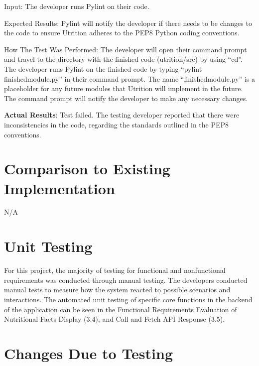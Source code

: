 \documentclass[12pt, titlepage]{article}
\begin{document}
\begin{enumerate}
		Input: The developer runs Pylint on their code.
		
		Expected Results: Pylint will notify the developer if there needs to be changes to the code to ensure Utrition adheres to the PEP8 Python coding conventions.
		
		How The Test Was Performed: The developer will open their command prompt and travel to the directory with the finished code (utrition/src) by using “cd”. The developer runs Pylint on the finished code by typing “pylint finishedmodule.py” in their command prompt. The name “finishedmodule.py” is a placeholder for any future modules that Utrition will implement in the future. The command prompt will notify the developer to make any necessary changes.
		
		\textbf{Actual Results}: Test failed. The testing developer reported that there were inconsistencies in the code, regarding the standards outlined in the PEP8 conventions.
		
		
	\end{enumerate}
	
	\section{Comparison to Existing Implementation}	
	
	N/A
	
	\section{Unit Testing}
	
	For this project, the majority of testing for functional and nonfunctional requirements was conducted through manual testing. The developers conducted manual tests to measure how the system reacted to possible scenarios and interactions. The automated unit testing of specific core functions in the backend of the application can be seen in the Functional Requirements Evaluation of Nutritional Facts Display (3.4), and Call and Fetch API Response (3.5).
	
	\section{Changes Due to Testing}
\end{document}
